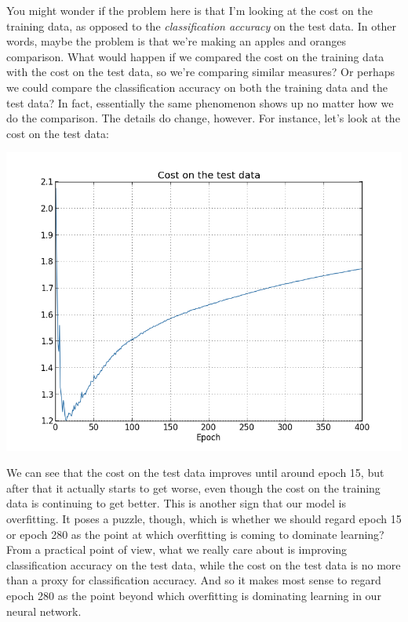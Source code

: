 \documentclass[a4paper,twoside,10pt]{book}
\begin{document}
You might wonder if the problem here is that I'm looking at the cost on the training data, as opposed to the \textit{classification accuracy} on the test data. In other words, maybe the problem is that we're making an apples and oranges comparison. What would happen if we compared the cost on the training data with the cost on the test data, so we're comparing similar measures? Or perhaps we could compare the classification accuracy on both the training data and the test data? In fact, essentially the same phenomenon shows up no matter how we do the comparison. The details do change, however. For instance, let's look at the cost on the test data:
\begin{center}
	\includegraphics[width=0.7\linewidth]{figures/ch3/overfitting3}
\end{center}
We can see that the cost on the test data improves until around epoch 15, but after that it actually starts to get worse, even though the cost on the training data is continuing to get better. This is another sign that our model is overfitting. It poses a puzzle, though, which is whether we should regard epoch 15 or epoch 280 as the point at which overfitting is coming to dominate learning? From a practical point of view, what we really care about is improving classification accuracy on the test data, while the cost on the test data is no more than a proxy for classification accuracy. And so it makes most sense to regard epoch 280 as the point beyond which overfitting is dominating learning in our neural network.
\end{document}
